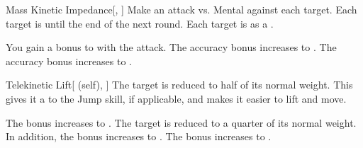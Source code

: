 \lowercase{\hypertarget{spell:Mass Kinetic Impedance}{}}\label{spell:Mass Kinetic Impedance}
\begin{freeability}[Rank 1]{\hypertarget{spell:Mass Kinetic Impedance}{Mass Kinetic Impedance}}[, ]
Make an attack vs. Mental against each target.
\hit Each target is  until the end of the next round.
\crit Each target is  as a .

\rankline
{} You gain a  bonus to  with the attack.
 The accuracy bonus increases to .
 The accuracy bonus increases to .

\end{freeability}
\vspace{0.25em}



\lowercase{\hypertarget{spell:Telekinetic Lift}{}}\label{spell:Telekinetic Lift}
\begin{attuneability}[Rank 1]{\hypertarget{spell:Telekinetic Lift}{Telekinetic Lift}}[ (self), ]
The target is reduced to half of its normal weight.
This gives it a   to the Jump skill, if applicable, and makes it easier to lift and move.

\rankline
{} The bonus increases to .
 The target is reduced to a quarter of its normal weight. In addition, the bonus increases to .
 The bonus increases to .

\end{attuneability}
\vspace{0.25em}




